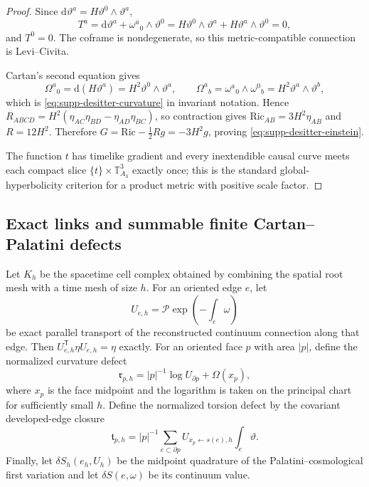\documentclass[11pt]{article}
\theoremstyle{definition}
\theoremstyle{remark}
\newcommand{\dd}{\mathrm d}
\newcommand{\Ric}{\mathrm{Ric}}
\begin{document}
\begin{proof}
Since
$\dd\vartheta^a=H\vartheta^0\wedge\vartheta^a$,
\[
 T^a=\dd\vartheta^a+\omega^a{}_0\wedge\vartheta^0
 =H\vartheta^0\wedge\vartheta^a
  +H\vartheta^a\wedge\vartheta^0=0,
\]
and $T^0=0$.  The coframe is nondegenerate, so this metric-compatible
connection is Levi--Civita.

Cartan's second equation gives
\[
 \Omega^a{}_0=\dd(H\vartheta^a)=H^2\vartheta^0\wedge\vartheta^a,
 \qquad
 \Omega^a{}_b=\omega^a{}_0\wedge\omega^0{}_b
 =H^2\vartheta^a\wedge\vartheta^b,
\]
which is \eqref{eq:supp-desitter-curvature} in invariant notation.  Hence
$R_{ABCD}=H^2(\eta_{AC}\eta_{BD}-\eta_{AD}\eta_{BC})$,
so contraction gives $\Ric_{AB}=3H^2\eta_{AB}$ and $R=12H^2$.  Therefore
$G=\Ric-\tfrac12Rg=-3H^2g$, proving
\eqref{eq:supp-desitter-einstein}.

The function $t$ has timelike gradient and every inextendible causal curve
meets each compact slice $\{t\}\times\mathbb T^3_{A_3}$ exactly once; this is
the standard global-hyperbolicity criterion for a product metric with positive
scale factor.
\end{proof}

\subsection{Exact links and summable finite Cartan--Palatini defects}

Let $K_h$ be the spacetime cell complex obtained by combining the spatial root
mesh with a time mesh of size $h$.  For an oriented edge $e$, let
\begin{equation}
 U_{e,h}=\mathcal P\exp\left(-\int_e\omega\right)
 \label{eq:supp-exact-link}
\end{equation}
be exact parallel transport of the reconstructed continuum connection along
that edge.  Then
$U_{e,h}^{\mathsf T}\eta U_{e,h}=\eta$ exactly.  For an oriented face $p$ with
area $|p|$, define the normalized curvature defect
\begin{equation}
 \mathfrak r_{p,h}
 =|p|^{-1}\log U_{\partial p}+\Omega(x_p),
 \label{eq:supp-curvature-defect}
\end{equation}
where $x_p$ is the face midpoint and the logarithm is taken on the principal
chart for sufficiently small $h$.  Define the normalized torsion defect by the
covariant developed-edge closure
\begin{equation}
 \mathfrak t_{p,h}
 =|p|^{-1}\sum_{e\subset\partial p}
  U_{x_p\leftarrow s(e),h}
  \int_e\vartheta.
 \label{eq:supp-torsion-defect}
\end{equation}
Finally, let $\delta S_h(e_h,U_h)$ be the midpoint quadrature of the
Palatini--cosmological first variation and let
$\delta S(e,\omega)$ be its continuum value.
\end{document}
